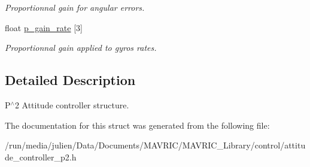 \begin{DoxyCompactItemize}
\begin{DoxyCompactList}\small\item\em Proportionnal gain for angular errors. \end{DoxyCompactList}\item 
\hypertarget{structattitude__controller__p2__t_afeffd3cc8e890d25809ba8a2af398a82}{float \hyperlink{structattitude__controller__p2__t_afeffd3cc8e890d25809ba8a2af398a82}{p\+\_\+gain\+\_\+rate} \mbox{[}3\mbox{]}}\label{structattitude__controller__p2__t_afeffd3cc8e890d25809ba8a2af398a82}

\begin{DoxyCompactList}\small\item\em Proportionnal gain applied to gyros rates. \end{DoxyCompactList}\end{DoxyCompactItemize}


\subsection{Detailed Description}
P$^\wedge$2 Attitude controller structure. 

The documentation for this struct was generated from the following file\+:\begin{DoxyCompactItemize}
\item 
/run/media/julien/\+Data/\+Documents/\+M\+A\+V\+R\+I\+C/\+M\+A\+V\+R\+I\+C\+\_\+\+Library/control/attitude\+\_\+controller\+\_\+p2.\+h\end{DoxyCompactItemize}
